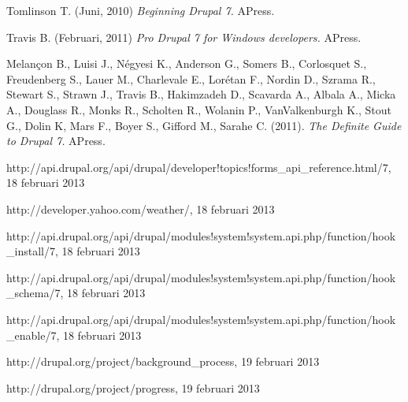 \begin{thebibliography}{99}

 
 


 Tomlinson T. (Juni, 2010) {\em Beginning Drupal 7.} APress.

 Travis B. (Februari, 2011) {\em Pro Drupal 7 for Windows developers.} APress.

 Melançon B., Luisi J., Négyesi K., Anderson G., Somers B., Corlosquet S., Freudenberg S., Lauer M., Charlevale E., Lorétan F., Nordin D., Szrama R., Stewart S., Strawn J., Travis B., Hakimzadeh D., Scavarda A., Albala A., Micka A., Douglass R., Monks R., Scholten R., Wolanin P., VanValkenburgh K., Stout G., Dolin K, Mars F., Boyer S., Gifford M., Sarahe C. (2011). {\em The Definite Guide to Drupal 7.} APress.

 http://api.drupal.org/api/drupal/developer!topics!forms\_api\_reference.html/7, 18 februari 2013

 http://developer.yahoo.com/weather/, 18 februari 2013

 http://api.drupal.org/api/drupal/modules!system!system.api.php/function/hook\_install/7, 18 februari 2013

 http://api.drupal.org/api/drupal/modules!system!system.api.php/function/hook\_schema/7, 18 februari 2013

 http://api.drupal.org/api/drupal/modules!system!system.api.php/function/hook\_enable/7, 18 februari 2013

 http://drupal.org/project/background\_process, 19 februari 2013

 http://drupal.org/project/progress, 19 februari 2013


\end{thebibliography}
